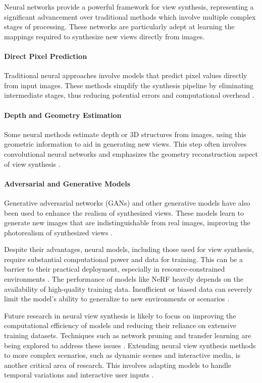 Neural networks provide a powerful framework for view synthesis, representing a significant advancement over traditional methods which involve multiple complex stages of processing. 
These networks are particularly adept at learning the mappings required to synthesize new views directly from images.

\paragraph{Direct Pixel Prediction}
Traditional neural approaches involve models that predict pixel values directly from input images. 
These methods simplify the synthesis pipeline by eliminating intermediate stages, thus reducing potential errors and computational overhead \cite{flynn_deep_2016}.

\paragraph{Depth and Geometry Estimation}
Some neural methods estimate depth or 3D structures from images, using this geometric information to aid in generating new views. 
This step often involves convolutional neural networks and emphasizes the geometry reconstruction aspect of view synthesis \cite{eigen2014depth}.

\paragraph{Adversarial and Generative Models}
Generative adversarial networks (GANs) and other generative models have also been used to enhance the realism of synthesized views. 
These models learn to generate new images that are indistinguishable from real images, improving the photorealism of synthesized views \cite{goodfellow2014generative}.


Despite their advantages, neural models, including those used for view synthesis, require substantial computational power and data for training. This can be a barrier to their practical deployment, especially in resource-constrained environments \cite{canziani2016analysis}.
The performance of models like NeRF heavily depends on the availability of high-quality training data. Insufficient or biased data can severely limit the model's ability to generalize to new environments or scenarios \cite{torralba2011unbiased}.

Future research in neural view synthesis is likely to focus on improving the computational efficiency of models and reducing their reliance on extensive training datasets. Techniques such as network pruning and transfer learning are being explored to address these issues \cite{han2015deep}.
Extending neural view synthesis methods to more complex scenarios, such as dynamic scenes and interactive media, is another critical area of research. This involves adapting models to handle temporal variations and interactive user inputs \cite{kopf2014first}.

